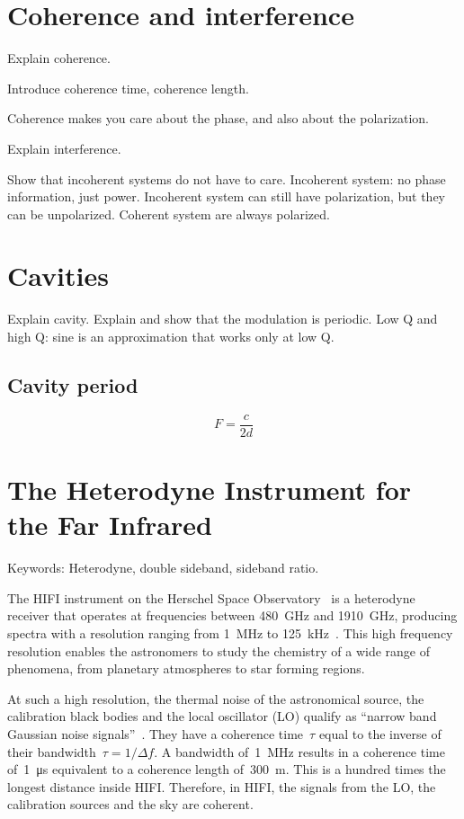 \section{Coherence and interference}
Explain coherence.

Introduce coherence time, coherence length.

Coherence makes you care about the phase, and also about the polarization.

Explain interference.

Show that incoherent systems do not have to care.
Incoherent system: no phase information, just power.
Incoherent system can still have polarization, but they can be unpolarized.
Coherent system are always polarized.



\section{Cavities}
Explain cavity.
Explain and show that the modulation is periodic.
Low Q and high Q: sine is an approximation that works only at low Q.

\subsection{Cavity period}
\begin{equation}
    F = \frac{c}{2d} \label{eq:cavity_period}
\end{equation}


\section{The Heterodyne Instrument for the Far Infrared}

Keywords: Heterodyne, double sideband, sideband ratio.

The HIFI instrument on the Herschel Space Observatory~\cite{AA_518_L1} is a heterodyne receiver that operates at frequencies between \SI{480}{\giga\hertz} and \SI{1910}{\giga\hertz},
producing spectra with a resolution ranging from \SI{1}{\mega\hertz} to \SI{125}{\kilo\hertz}~\cite{AA_518_L6}.
This high frequency resolution enables the astronomers to study the chemistry of a wide range of phenomena, from planetary atmospheres to star forming regions.

At such a high resolution, the thermal noise of the astronomical source, the calibration black bodies and the local oscillator (LO) qualify as ``narrow band Gaussian noise signals''~\cite{siegman1986lasers}.
They have a coherence time~$\tau$ equal to the inverse of their bandwidth~$\tau=1/\Delta f$.
A bandwidth of~\SI{1}{\mega\hertz} results in a coherence time of~\SI{1}{\micro\second} equivalent to a coherence length of~\SI{300}{\meter}.
This is a hundred times the longest distance inside HIFI.
Therefore, in HIFI, the signals from the LO, the calibration sources and the sky are coherent.


